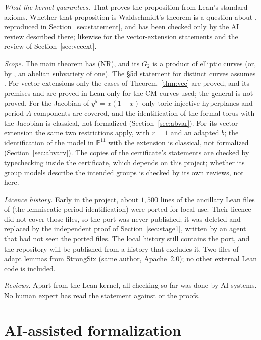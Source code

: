 \documentclass[11pt]{amsart}
\theoremstyle{definition}
\theoremstyle{remark}
\numberwithin{equation}{section}
\newcommand{\PP}{\mathbb{P}}
\newcommand{\NR}{\textup{(NR)}}
\begin{document}
\emph{What the kernel guarantees.} That  proves the proposition
 from Lean's standard axioms. Whether that proposition is Waldschmidt's theorem
is a question about , reproduced in Section~\ref{sec:statement}, and has been
checked only by the AI review described there; likewise for the vector-extension statements and the review
of Section~\ref{sec:vecext}.

\emph{Scope.} The main theorem has \NR, and its $G_2$ is a product of elliptic curves (or, by
, an abelian subvariety of one). The \S5d statement for distinct curves assumes
. For vector extensions only the cases of Theorem~\ref{thm:vec} are proved, and its premises
 and  are proved in Lean only for the CM curves used; the general
 is not proved. For the Jacobian of $y^5=x(1-x)$ only toric-injective hyperplanes and
period $A$-components are covered, and the identification of the formal torus with the Jacobian is
classical, not formalized (Section~\ref{sec:abvar}). For its vector extension the same two restrictions apply,
with $r=1$ and an adapted $b$; the identification of the model in $\PP^{11}$ with the extension is classical, not
formalized (Section~\ref{sec:abvarv}). The copies of the certificate's statements are checked by
typechecking inside the certificate, which depends on this project; whether its group models describe
the intended groups is checked by its own reviews, not here.

\emph{Licence history.} Early in the project, about $1{,}500$ lines of the ancillary Lean files of
\cite{ChCh26} (the lemniscatic period identification) were ported for local use. Their licence did not
cover those files, so the port was never published; it was deleted and replaced by the independent proof
of Section~\ref{sec:stage1}, written by an agent that had not seen the ported files. The local history
still contains the port, and the repository will be published from a history that excludes it. Two
files of  adapt lemmas from StrongSix (same author, Apache~2.0); no other external
Lean code is included.

\emph{Reviews.} Apart from the Lean kernel, all checking so far was done by AI systems. No human
expert has read the statement against \cite{W88} or the proofs.

\section{AI-assisted formalization}\label{sec:workflow}
\end{document}
